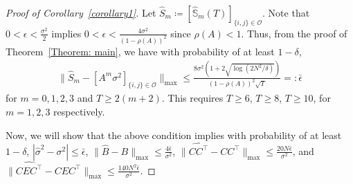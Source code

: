 \documentclass[11pt]{article}
\begin{document}
\begin{proof}[Proof of Corollary~\ref{corollary1}]
Let $\hat{S}_m \coloneqq [\hat{\mathbb{S}}_m(T)]_{\{i,j\}\in\mathcal{O}}$. Note that $0<\epsilon <\frac{\sigma^2}{2}$ implies $0<\epsilon <\frac{4\sigma^2}{(1-\rho(A))^2}$ since $\rho(A)<1$. Thus, from the proof of Theorem~\ref{Theorem: main}, we have with probability of at least $1-\delta$,  
\begin{align*}
    \|\hat{S}_m-[A^m\sigma^2]_{\{i,j\}\in\mathcal{O}}\|_{\max}
    \le \frac{8\sigma^2(1+2\sqrt{\log(2N^2/\delta)})}{(1-\rho(A))^2\sqrt{T}} =: \bar{\epsilon}
\end{align*}
for $m=0,1,2,3$ and $T\ge 2(m+2)$. This requires $T\ge 6$, $T\ge 8$, $T\ge 10$, for $m=1,2,3$ respectively.


Now, we will show that the above condition implies with probability of at least $1-\delta$, $|\hat{\sigma}^2 - \sigma^2| \le \bar{\epsilon}$, $\|\hat{B} - B\|_{\max} \le \frac{4\bar{\epsilon}}{\sigma^2}$, $\|\widehat{CC^\top} - CC^\top\|_{\max} \le \frac{20N\bar{\epsilon}}{\sigma^2}$, and $\|\widehat{CEC^\top} - CEC^\top\|_{\max} \le \frac{140N^2\bar{\epsilon}}{\sigma^2}$.




\end{proof}
\end{document}
